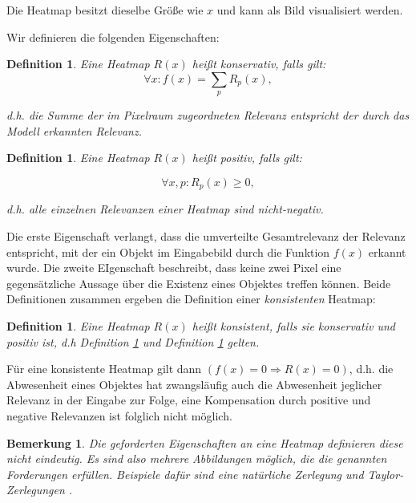 \documentclass[11pt,a4paper]{article}
\def\emph#1{\textit{#1}}
\newtheorem{definition}[theorem]{Definition}
\newtheorem{remark}[theorem]{Bemerkung}
\numberwithin{equation}{section}
\begin{document}
	Die Heatmap besitzt dieselbe Größe wie $x$ und kann als Bild visualisiert werden.
	
	Wir definieren die folgenden Eigenschaften:
	
	\begin{definition}\label{def_konservativ}
		Eine Heatmap $R(x)$ heißt \emph{konservativ}, falls gilt:
		\begin{equation}
		\forall x: f(x) = \sum_p R_p(x),
		\end{equation}
		
		d.h. die Summe der im Pixelraum zugeordneten Relevanz entspricht der durch das Modell erkannten Relevanz.
	\end{definition}
	
	
	\begin{definition} \label{def_pos}
		Eine Heatmap $R(x)$ heißt \emph{positiv}, falls gilt:
		
		\begin{equation}
		\forall x,p: R_p(x) \geq 0,
		\end{equation}
		
		d.h. alle einzelnen Relevanzen einer Heatmap sind nicht-negativ.
		
	\end{definition}
	
	Die erste Eigenschaft verlangt, dass die umverteilte Gesamtrelevanz der Relevanz entspricht, mit der ein Objekt im Eingabebild durch die Funktion $f(x)$ erkannt wurde.
	Die zweite EIgenschaft beschreibt, dass keine zwei Pixel eine gegensätzliche Aussage über die Existenz eines Objektes treffen können. Beide Definitionen zusammen ergeben die Definition einer \textit{konsistenten} Heatmap:
	
	\begin{definition}
		Eine Heatmap $R(x)$ heißt \emph{konsistent}, falls sie konservativ und positiv ist, d.h Definition \ref{def_konservativ} und Definition \ref{def_pos} gelten.
	\end{definition}
	
	Für eine konsistente Heatmap gilt dann $(f(x) = 0 \Rightarrow R(x) = 0)$, d.h. die Abwesenheit eines Objektes hat zwangsläufig auch die Abwesenheit jeglicher Relevanz in der Eingabe zur Folge, eine Kompensation durch positive und negative Relevanzen ist folglich nicht möglich.
	
	\begin{remark}
		Die geforderten Eigenschaften an eine Heatmap definieren diese nicht eindeutig. Es sind also mehrere Abbildungen möglich, die die genannten Forderungen erfüllen. Beispiele dafür sind eine natürliche Zerlegung und Taylor-Zerlegungen \cite{dtd_paper}.
	\end{remark}
	
\end{document}
